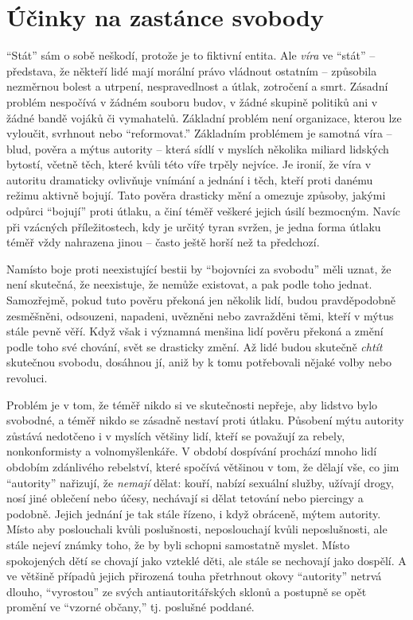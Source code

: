 \documentclass{book}
\begin{document}
\section{Účinky na zastánce svobody}

\enquote{Stát} sám o sobě neškodí, protože je to fiktivní entita. Ale \emph{víra} ve \enquote{stát} -- představa, že někteří lidé mají morální právo vládnout ostatním -- způsobila nezměrnou bolest a utrpení, nespravedlnost a útlak, zotročení a smrt. Zásadní problém nespočívá v žádném souboru budov, v žádné skupině politiků ani v žádné bandě vojáků či vymahatelů. Základní problém není organizace, kterou lze vyloučit, svrhnout nebo \enquote{reformovat.} Základním problémem je samotná víra -- blud, pověra a mýtus autority -- která sídlí v myslích několika miliard lidských bytostí, včetně těch, které kvůli této víře trpěly nejvíce. Je ironií, že víra v autoritu dramaticky ovlivňuje vnímání a jednání i těch, kteří proti danému režimu aktivně bojují. Tato pověra drasticky mění a omezuje způsoby, jakými odpůrci \enquote{bojují} proti útlaku, a činí téměř veškeré jejich úsilí bezmocným. Navíc při vzácných příležitostech, kdy je určitý tyran svržen, je jedna forma útlaku téměř vždy nahrazena jinou -- často ještě horší než ta předchozí.

Namísto boje proti neexistující bestii by \enquote{bojovníci za svobodu} měli uznat, že není skutečná, že neexistuje, že nemůže existovat, a pak podle toho jednat. Samozřejmě, pokud tuto pověru překoná jen několik lidí, budou pravděpodobně zesměšněni, odsouzeni, napadeni, uvězněni nebo zavražděni těmi, kteří v mýtus stále pevně věří. Když však i významná menšina lidí pověru překoná a změní podle toho své chování, svět se drasticky změní. Až lidé budou skutečně \emph{chtít} skutečnou svobodu, dosáhnou jí, aniž by k tomu potřebovali nějaké volby nebo revoluci.

Problém je v tom, že téměř nikdo si ve skutečnosti nepřeje, aby lidstvo bylo svobodné, a téměř nikdo se zásadně nestaví proti útlaku. Působení mýtu autority zůstává nedotčeno i v myslích většiny lidí, kteří se považují za rebely, nonkonformisty a volnomyšlenkáře. V období dospívání prochází mnoho lidí obdobím zdánlivého rebelství, které spočívá většinou v tom, že dělají vše, co jim \enquote{autority} nařizují, že \emph{nemají} dělat: kouří, nabízí sexuální služby, užívají drogy, nosí jiné oblečení nebo účesy, nechávají si dělat tetování nebo piercingy a podobně. Jejich jednání je tak stále řízeno, i když obráceně, mýtem autority. Místo aby poslouchali kvůli poslušnosti, neposlouchají kvůli neposlušnosti, ale stále nejeví známky toho, že by byli schopni samostatně myslet. Místo spokojených dětí se chovají jako vzteklé děti, ale stále se nechovají jako dospělí. A ve většině případů jejich přirozená touha přetrhnout okovy \enquote{autority} netrvá dlouho, \enquote{vyrostou} ze svých antiautoritářských sklonů a postupně se opět promění ve \enquote{vzorné občany,} tj. poslušné poddané.
\end{document}
